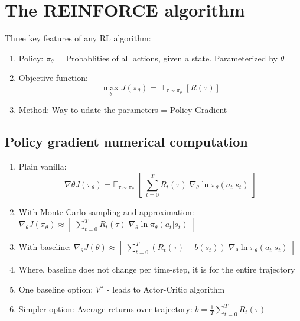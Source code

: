 \documentclass[a4paper, 12pt]{article}
\begin{document}
\section{The REINFORCE algorithm}
Three key features of any RL algorithm:
\begin{enumerate}
	\item Policy: $\pi_\theta$ = Probablities of all actions, given a state. Parameterized by $\theta$
	\item Objective function:
	\begin{equation}
		\max_{\theta} J(\pi_{\theta}) = \mathop{\mathbb{E}}_{\tau \sim \pi_\theta} [R(\tau)]
	\end{equation}
	\item Method: Way to udate the parameters = Policy Gradient

\end{enumerate}

\subsection{Policy gradient numerical computation}

\begin{enumerate}
	\item Plain vanilla: 
	\begin{equation}
		\nabla \theta J(\pi_\theta) = \mathbb{E}_{\tau \sim \pi_\theta} \; [ \; \sum_{t=0}^T R_t(\tau) \; \nabla_\theta \ln \pi_\theta(a_t \vert s_t) \;]
	\end{equation}
	\item With Monte Carlo sampling and approximation: $\nabla_\theta J(\pi_\theta) \approx [ \; \sum_{t=0}^T R_t(\tau) \; \nabla_\theta \ln \pi_\theta(a_t \vert s_t) \;]$
	\item With baseline: $\nabla_\theta J(\theta) \approx [ \; \sum_{t=0}^T (R_t(\tau) - b(s_t)) \; \nabla_\theta \ln \pi_\theta(a_t \vert s_t) \;]$
	\item Where, baseline does not change per time-step, it is for the entire trajectory
	\item One baseline option: $V^\pi$ - leads to Actor-Critic algorithm
	\item Simpler option: Average returns over trajectory: $b = \frac{1}{T}\sum_{t=0}^T R_t(\tau) $
\end{enumerate}
\end{document}
